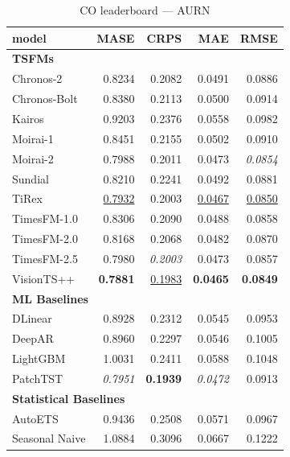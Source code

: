 \begin{table}[H]
\caption{CO leaderboard --- AURN}
\centering
\begin{small}
\begin{tabular}{lrrrr}
\toprule
model & MASE & CRPS & MAE & RMSE \\
\midrule
\multicolumn{5}{l}{\textbf{TSFMs}} \\
Chronos-2 & 0.8234 & 0.2082 & 0.0491 & 0.0886 \\
Chronos-Bolt & 0.8380 & 0.2113 & 0.0500 & 0.0914 \\
Kairos & 0.9203 & 0.2376 & 0.0558 & 0.0982 \\
Moirai-1 & 0.8451 & 0.2155 & 0.0502 & 0.0910 \\
Moirai-2 & 0.7988 & 0.2011 & 0.0473 & \textit{0.0854} \\
Sundial & 0.8210 & 0.2241 & 0.0492 & 0.0881 \\
TiRex & \underline{0.7932} & 0.2003 & \underline{0.0467} & \underline{0.0850} \\
TimesFM-1.0 & 0.8306 & 0.2090 & 0.0488 & 0.0858 \\
TimesFM-2.0 & 0.8168 & 0.2068 & 0.0482 & 0.0870 \\
TimesFM-2.5 & 0.7980 & \textit{0.2003} & 0.0473 & 0.0857 \\
VisionTS++ & \textbf{0.7881} & \underline{0.1983} & \textbf{0.0465} & \textbf{0.0849} \\
\midrule
\multicolumn{5}{l}{\textbf{ML Baselines}} \\
DLinear & 0.8928 & 0.2312 & 0.0545 & 0.0953 \\
DeepAR & 0.8960 & 0.2297 & 0.0546 & 0.1005 \\
LightGBM & 1.0031 & 0.2411 & 0.0588 & 0.1048 \\
PatchTST & \textit{0.7951} & \textbf{0.1939} & \textit{0.0472} & 0.0913 \\
\midrule
\multicolumn{5}{l}{\textbf{Statistical Baselines}} \\
AutoETS & 0.9436 & 0.2508 & 0.0571 & 0.0967 \\
Seasonal Naive & 1.0884 & 0.3096 & 0.0667 & 0.1222 \\
\bottomrule
\end{tabular}
\end{small}
\end{table}